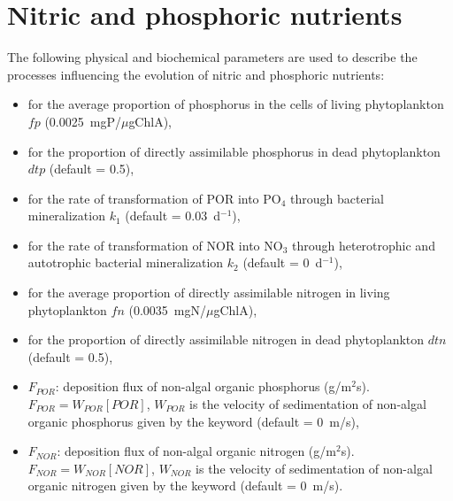 \section{Nitric and phosphoric nutrients}

The following physical and biochemical parameters are used
to describe the processes influencing the evolution of nitric and phosphoric nutrients:

\begin{itemize}
\item {}
  for the average proportion of phosphorus in the cells of living phytoplankton $fp$ (0.0025~mgP/$\mu$gChlA),
\item {}
  for the proportion of directly assimilable phosphorus in dead phytoplankton $dtp$ (default = 0.5),
\item {}
  for the rate of transformation of POR into PO$_4$ through bacterial mineralization $k_1$ (default = 0.03~d$^{-1}$),
\item {}
  for the rate of transformation of NOR into NO$_3$ through heterotrophic
  and autotrophic bacterial mineralization $k_2$ (default = 0~d$^{-1}$),
\item {}
  for the average proportion of directly assimilable nitrogen in living phytoplankton $fn$ (0.0035~mgN/$\mu$gChlA),
\item {}
  for the proportion of directly assimilable nitrogen in dead phytoplankton $dtn$ (default = 0.5),
\item $F_{POR}$: deposition flux of non-algal organic phosphorus (g/m$^2$s).
  $F_{POR} = W_{POR} [POR]$,
  $W_{POR}$ is the velocity of sedimentation of non-algal organic phosphorus
  given by the keyword 
  (default = 0~m/s),
\item $F_{NOR}$: deposition flux of non-algal organic nitrogen (g/m$^2$s).
  $F_{NOR} = W_{NOR} [NOR]$, $W_{NOR}$ is the velocity of sedimentation of non-algal organic nitrogen
  given by the keyword 
  (default = 0~m/s).
\end{itemize}
